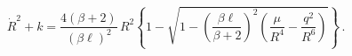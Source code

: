 \begin{equation}\dot{R}^2+k=\frac{4(\beta+2)}{(\beta\ell)^2}\,R^2\left\{1-
\sqrt{1-\left(\frac{\beta\ell}{\beta+2}\right)^2\left(\frac{\mu}{R^4}-\frac{q^2}{R^6}
\right)}\right\}\,.
\label{exact} \end{equation}

